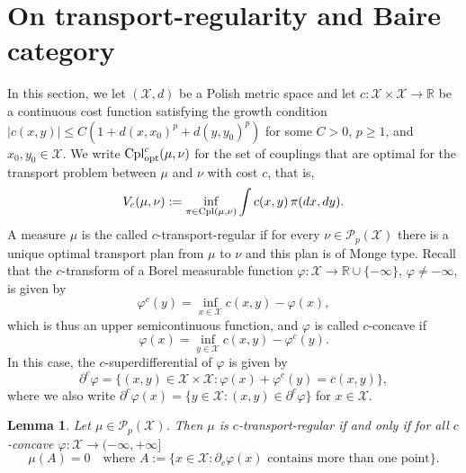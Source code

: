 \documentclass[a4paper]{amsart}
\numberwithin{theorem}{section}
\newtheorem{lemma}[theorem]{Lemma}
\theoremstyle{definition}
\newcommand{\R}{\mathbb{R}}
\newcommand{\cpl}{\textup{Cpl}}
\newcommand{\Pc}{\mathcal P}
\newcommand{\cplopt}{\cpl_{\rm opt}}
\renewcommand{\phi}{\varphi}
\begin{document}
\section{On transport-regularity and Baire category} \label{sec:PolishnessOfRegularMeasures}

In this section, we let $(\mathcal X,d)$ be a Polish metric space
and let $c : \mathcal X \times \mathcal X \to \R$ be a continuous cost function satisfying the growth condition $|c(x,y)| \le C ( 1 + d(x,x_0)^p + d(y,y_0)^p)$ for some $C>0$, $p \ge 1$, and $x_0,y_0 \in \mathcal X$.
We write $\cplopt^c(\mu,\nu)$ for the set of couplings that are optimal for the transport problem between $\mu$ and $\nu$ with cost $c$, that is,
\[
    V_c(\mu,\nu) := \inf_{\pi \in \cpl(\mu,\nu)} \int c(x,y) \, \pi(dx,dy).
\]
A measure $\mu$ is the called $c$-transport-regular if for every $\nu \in \Pc_p(\mathcal X)$ there is a unique optimal transport plan from $\mu$ to $\nu$ and this plan is of Monge type.
Recall that the $c$-transform of a Borel measurable function $\phi : \mathcal X \to \mathbb R \cup \{ - \infty \}$, $\phi \neq -\infty$, is given by
\[
    \phi^c(y) = \inf_{x \in \mathcal X} c(x,y) - \phi(x),
\]
which is thus an upper semicontinuous function, and $\phi$ is called $c$-concave if
\[
    \phi(x) = \inf_{y \in \mathcal X} c(x,y) - \phi^c(y).
\]
In this case, the $c$-superdifferential of $\phi$ is given by
\[
    \partial^c \phi = \{ (x,y) \in \mathcal X \times \mathcal X : \phi(x) + \phi^c(y) = c(x,y) \},
\]
where we also write $\partial^c\phi(x) = \{ y \in \mathcal X : (x,y) \in \partial^c \phi \}$ for $x \in \mathcal X$.


\begin{lemma} \label{lem:apx.char.TR}
    Let $\mu \in \Pc_p(\mathcal X)$. Then $\mu$ is $c$-transport-regular if and only if for all $c$-concave $\phi : \mathcal X \to (-\infty,+\infty]$
            \begin{equation}
        \label{eq:subdiff.big}
        \mu(A) = 0 \quad\text{where }A:=\{x \in \mathcal X : \partial_c \phi(x) \text{ contains more than one point} \}.
    \end{equation}
\end{lemma}
\end{document}
